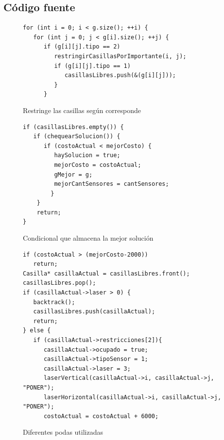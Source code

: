 \subsection{Código fuente}

\begin{figure}[H]
\begin{center}
\begin{verbatim}
for (int i = 0; i < g.size(); ++i) {
   for (int j = 0; j < g[i].size(); ++j) {
      if (g[i][j].tipo == 2)
         restringirCasillasPorImportante(i, j); 
         if (g[i][j].tipo == 1) 
            casillasLibres.push(&(g[i][j]));
         }
      }
\end{verbatim}
\caption{Restringe las casillas según corresponde}
\end{center}
\end{figure}

\begin{figure}[H]
\begin{center}
\begin{verbatim}
if (casillasLibres.empty()) {
   if (chequearSolucion()) { 
      if (costoActual < mejorCosto) {
         haySolucion = true;
         mejorCosto = costoActual;
         gMejor = g;	
         mejorCantSensores = cantSensores;
        }
    }
    return;
}
\end{verbatim}
\caption{Condicional que almacena la mejor solución}
\end{center}
\end{figure}

\begin{figure}[H]
\begin{center}
\begin{verbatim}
if (costoActual > (mejorCosto-2000))
   return;
Casilla* casillaActual = casillasLibres.front();  
casillasLibres.pop();
if (casillaActual->laser > 0) {
   backtrack();
   casillasLibres.push(casillaActual);
   return;
} else {
   if (casillaActual->restricciones[2]){ 
      casillaActual->ocupado = true;
      casillaActual->tipoSensor = 1;
      casillaActual->laser = 3;
      laserVertical(casillaActual->i, casillaActual->j, "PONER");
      laserHorizontal(casillaActual->i, casillaActual->j, "PONER");
      costoActual = costoActual + 6000;
\end{verbatim}
\caption{Diferentes podas utilizadas}
\end{center}
\end{figure}

